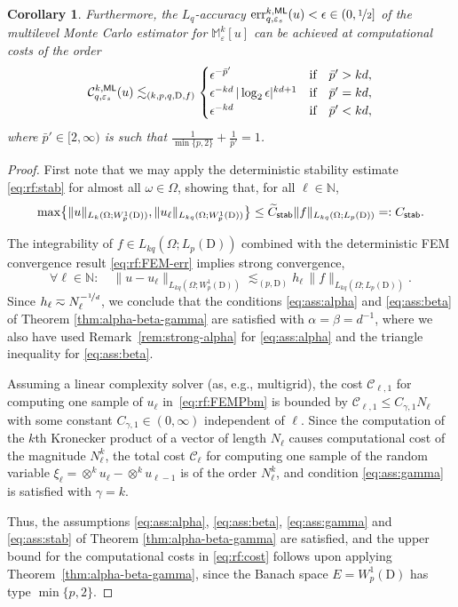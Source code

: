 \documentclass[reqno]{amsart}
\numberwithin{equation}{section}
\newcommand{\bbM}{\mathbb{M}}
\newcommand{\bbN}{\mathbb{N}}
\newcommand{\cC}{\mathcal{C}}
\newcommand{\xk}{\otimes^k}
\newcommand{\Mk}{\bbM^k_\varepsilon}
\newcommand{\norm}[2]{     \| #1       \|_{ #2 }}
\newcommand{\dom}{\mathrm{D}}
\newcommand{\eps}{\varepsilon}
\newcommand{\Cstab}{C_{\sf stab}}
\newtheorem{corollary}[lemma]{Corollary}
\theoremstyle{remark}
\theoremstyle{definition}
\begin{document}
\begin{corollary}
	Furthermore, the $L_q$-accuracy 
	$\mathrm{err}_{q,\eps_s}^{k,\sf ML}(u) < \epsilon\in (0,\nicefrac{1}{2}]$ 
	of the multilevel Monte Carlo estimator for $\Mk[u]$ 
	can be achieved at computational 
	costs of the order 
	\begin{equation}\label{eq:rf:cost} 
	\cC^{k, \sf ML}_{q,\eps_s}(u)
	\lesssim_{(k,p,q,\dom,f)}  
	\begin{cases} 
	\epsilon^{-\bar{p}'}  
	& \text{if}\quad \bar{p}' > kd, 
	\\ 
	\epsilon^{-kd} 
	\, |\log_2 \epsilon|^{kd+1} 
	&\text{if}\quad \bar{p}' = kd, 
	\\
	\epsilon^{-kd} 
	& \text{if}\quad 
	\bar{p}' < kd, 
	\end{cases}
	\end{equation}
	where $\bar{p}'\in[2,\infty)$ is such that 
	$\tfrac{1}{\min\{p,2\}} + \tfrac{1}{\bar{p}'} = 1$. 
\end{corollary} 

\begin{proof} 
	First note that  
	we may apply the deterministic 
	stability estimate \eqref{eq:rf:stab} 
	for almost all $\omega\in\Omega$, 
	showing that, for all $\ell\in\bbN$, 
	\[ 
	\max\bigl\{ 
	\norm{ u }{L_k(\Omega;W^1_p(\dom))} , 
	\norm{ u_\ell }{L_{kq}(\Omega;W^1_p(\dom))} 
	\bigr\} 
	\leq 
	\widetilde{C}_{\sf stab} 
	\norm{ f }{L_{kq}(\Omega;L_p(\dom))} 
	=: 
	\Cstab.
	\] 
	
	The integrability of 
	$f\in L_{kq}(\Omega; L_p(\dom))$ combined with 
	the deterministic FEM convergence result \eqref{eq:rf:FEM-err} 
	implies strong convergence, 
	\[
	\forall \ell\in\bbN: 
	\quad 
	\norm{u - u_\ell}{L_{kq}(\Omega;W^1_p(\dom))}
	\lesssim_{(p,\dom)} 
	h_\ell 
	\, 
	\norm{f}{L_{kq}(\Omega;L_p(\dom))}. 
	\]
	Since $h_\ell \eqsim N_\ell^{-\nicefrac{1}{d}}$\!,
	we conclude that the 
	conditions \eqref{eq:ass:alpha} and \eqref{eq:ass:beta} 
	of Theorem \ref{thm:alpha-beta-gamma}
	are satisfied with $\alpha=\beta=d^{-1}$\!, 
	where we also have used  
	Remark~\ref{rem:strong-alpha} for \eqref{eq:ass:alpha}
	and the triangle inequality for \eqref{eq:ass:beta}. 
	
	Assuming a linear complexity solver (as, e.g., multigrid), 
	the cost $\cC_{\ell,1}$ for computing one sample 
	of $u_\ell$ in~\eqref{eq:rf:FEMPbm} 
	is bounded by  
	$\cC_{\ell,1} \leq C_{\gamma,1} N_\ell$ 
	with some constant $C_{\gamma,1}\in(0,\infty)$ 
	independent of $\ell$.
	Since the computation of the $k$th Kronecker product 
	of a vector of length $N_\ell$ causes computational 
	cost of the magnitude $N_\ell^k$\!, 
	the total cost $\cC_\ell$ for computing one sample 
	of the random variable 
	$\xi_\ell = \xk u_\ell - \xk u_{\ell-1}$ 
	is of the order $N_\ell^k$, and 
	condition \eqref{eq:ass:gamma} 
	is satisfied with $\gamma=k$. 
	
	Thus, the assumptions 
	\eqref{eq:ass:alpha}, 
	\eqref{eq:ass:beta}, 
	\eqref{eq:ass:gamma} and  
	\eqref{eq:ass:stab} 
	of Theorem \ref{thm:alpha-beta-gamma} 
	are satisfied, and the upper bound for the 
	computational costs in \eqref{eq:rf:cost} 
	follows upon applying  
	Theorem~\ref{thm:alpha-beta-gamma}, 
	since the Banach space $E=W^1_p(\dom)$ 
	has type $\min\{p,2\}$. 
\end{proof} 
\end{document}
